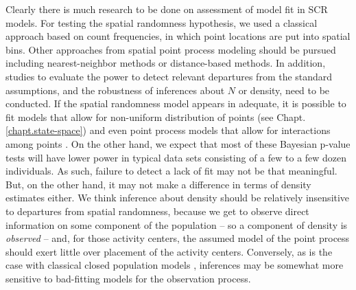 Clearly there is much research to be done on assessment of model fit
in SCR models. For testing the spatial randomness hypothesis, we used
a classical approach based on count frequencies, in which point
locations are put into spatial bins. Other approaches from spatial
point process modeling should be pursued including nearest-neighbor
methods or distance-based methods. In addition, studies to evaluate
the power to detect relevant departures from the standard
assumptions, and the robustness of inferences about $N$ or density,
need to be conducted.  If the spatial randomness model appears in
adequate, it is possible to fit models that allow for non-uniform
distribution of points (see Chapt. \ref{chapt.state-space}) and even
point process models that allow for interactions among points
\citep{reich_etal:2012}. On the other hand, we expect that most of
these Bayesian p-value tests will have lower power in typical data
sets consisting of a few to a few dozen individuals. As such, failure
to detect a lack of fit may not be that meaningful. But, on the other
hand, it may not make a difference in terms of density estimates
either.  We think inference about density should be relatively
insensitive to departures from spatial randomness, because we get to
observe direct information on some component of the population -- so a
component of density is {\it observed} -- and, for those activity
centers, the assumed model of the point process should exert little
over placement of the activity centers.  Conversely, as is the case
with classical closed population models \citep{otis_etal:1978,dorazio_royle:2003,
  link:2003}, inferences may be somewhat more sensitive to
bad-fitting models for the observation process.












